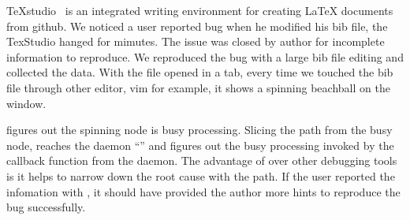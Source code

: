 TeXstudio~\cite{texstudio} is an integrated writing environment for creating
LaTeX documents from github. We noticed a user reported bug when he modified his
bib file, the TexStudio hanged for mimutes. The issue was closed by author for
incomplete information to reproduce. We reproduced the bug with a large bib file
editing and collected the data. With the file opened in a tab, every time we
touched the bib file through other editor, vim for example, it shows a spinning
beachball on the window.

\xxx figures out the spinning node is busy processing. Slicing the path from the
busy node, \xxx reaches the daemon ``'' and figures out the busy
processing invoked by the callback function from the daemon. The advantage of
\xxx over other debugging tools is it helps to narrow down the root cause with
the path. If the user reported the infomation with \xxx, it should have provided
the author more hints to reproduce the bug successfully.

